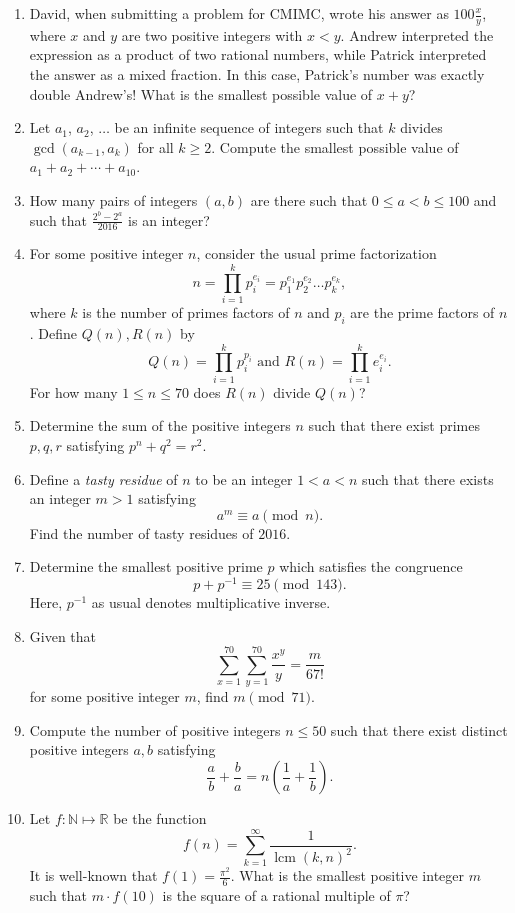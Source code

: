 \documentclass[10pt]{article}
\begin{document}
\begin{enumerate}
\setlength{\itemsep}{3pt}

\item David, when submitting a problem for CMIMC, wrote his answer 
	as $100\tfrac xy$, where $x$ and $y$ are two positive integers
	with $x<y$. Andrew interpreted the expression as a product of two
	rational numbers, while Patrick interpreted the answer as a mixed
	fraction. In this case, Patrick's number was exactly double Andrew's!  
	What is the smallest possible value of $x+y$? %

\item Let $a_1$, $a_2$, $\ldots$ be an infinite sequence of integers such that
	$k$ divides $\gcd(a_{k-1},a_k)$ for all $k\geq 2$.  Compute the smallest possible value of $a_1+a_2+\cdots+a_{10}$. %

\item How many pairs of integers $(a,b)$ are there such that $0\leq a < b \leq 100$ and such that $\tfrac{2^b-2^a}{2016}$ is an integer? %

\item For some positive integer $n$, consider the usual prime factorization \[n =
	\displaystyle \prod_{i=1}^{k} p_{i}^{e_{i}}=p_1^{e_1}p_2^{e_2}\ldots p_k^{e_k},\] where $k$ is the number of
	primes factors of $n$ and $p_{i}$ are the prime factors of $n$. Define
	$Q(n), R(n)$ by
	\[
		Q(n) = \prod_{i=1}^{k} p_{i}^{p_{i}} \text{ and } R(n) =
		\prod_{i=1}^{k} e_{i}^{e_{i}}.
	\]
	For how many $1 \leq n \leq 70$ does $R(n)$ divide $Q(n)$?

\item Determine the sum of the positive integers $n$ such that there exist primes
	$p,q,r$ satisfying $p^{n} + q^{2} = r^{2}$. %

\item Define a \textit{tasty residue} of $n$ to be an integer $1<a<n$ such that there exists an integer $m>1$ satisfying \[a^m\equiv a\pmod n.\] Find the number of tasty residues of $2016$. %

\item Determine the smallest positive prime $p$ which satisfies the congruence \[p+p^{-1}\equiv 25\pmod{143}.\] Here, $p^{-1}$ as usual denotes multiplicative inverse. %

\item Given that
	\[
		\sum_{x=1}^{70}  \sum_{y=1}^{70} \frac{x^{y}}{y} =
		\frac{m}{67!}
	\]
	for some positive integer $m$, find $m \pmod{71}$.


\item Compute the number of positive integers $n \leq 50$ such that there exist
	distinct positive integers $a,b$ satisfying 
	\[
		\frac{a}{b} +\frac{b}{a} = n \left(\frac{1}{a} + \frac{1}{b}\right).
	\]

\item Let $f:\mathbb{N}\mapsto\mathbb{R}$ be the function
	\[f(n)=\sum_{k=1}^\infty\dfrac{1}{\operatorname{lcm}(k,n)^2}.\] It is
	well-known that $f(1)=\tfrac{\pi^2}6$.  What is the smallest positive
	integer $m$ such that $m\cdot f(10)$ is the square of a rational multiple of $\pi$? %

\end{enumerate}
\end{document}
